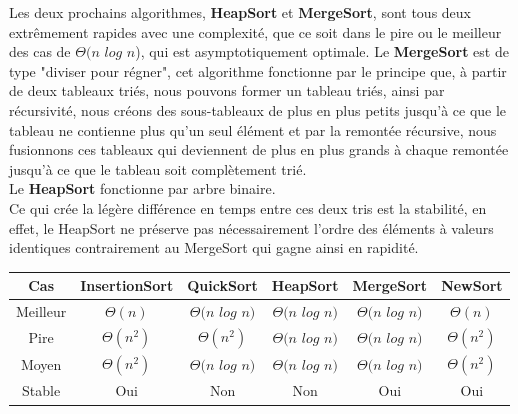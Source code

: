 \documentclass[a4paper, 11pt, oneside]{article}
\begin{document}
Les deux prochains algorithmes, \textbf{HeapSort} et \textbf{MergeSort}, sont tous deux extrêmement rapides avec une complexité, que ce soit dans le pire ou le meilleur des cas de $\Theta(n$ $log$ $n$),  qui est asymptotiquement optimale. Le \textbf{MergeSort} est de type "diviser pour régner", cet algorithme fonctionne par le principe que, à partir de deux tableaux triés, nous pouvons former un tableau triés, ainsi par récursivité, nous créons des sous-tableaux de plus en plus petits jusqu'à ce que le tableau ne contienne plus qu'un seul élément et par la remontée récursive, nous fusionnons ces tableaux qui deviennent de plus en plus grands à chaque remontée jusqu'à ce que le tableau soit complètement trié.\\ Le \textbf{HeapSort} fonctionne par arbre binaire. \\
Ce qui crée la légère différence en temps entre ces deux tris est la stabilité, en effet, le HeapSort ne préserve pas nécessairement l’ordre des éléments à valeurs identiques contrairement au MergeSort qui gagne ainsi en rapidité.

\begin{table}[htb]
\begin{tabular}{cccccc}
\hline

Cas   & InsertionSort & QuickSort & HeapSort & MergeSort & NewSort \\ \hline
Meilleur & $\Theta(n)$      & $\Theta(n$ $log$ $n)$   & $\Theta(n$ $log$ $n)$        & $\Theta(n$ $log$ $n)$          & $\Theta(n)$        \\
Pire & $\Theta(n^{2})$     & $\Theta(n^{2})$  & $\Theta(n$ $log$ $n)$         & $\Theta(n$ $log$ $n)$ & $\Theta(n^{2})$       \\
Moyen & $\Theta(n^{2})$      & $\Theta(n$ $log$ $n)$  & $\Theta(n$ $log$ $n)$         & $\Theta(n$ $log$ $n)$         & $\Theta(n^{2})$        \\
Stable & Oui      & Non  & Non         & Oui          & Oui        \\
  
\end{tabular}
\end{table}
\end{document}
